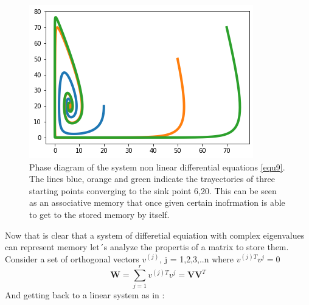 \documentclass[journal]{IEEEtai}
\begin{document}
\begin{figure}
\centering
\includegraphics[width=\linewidth]{SINK.png}
\caption{Phase diagram of the system non linear differential equations \ref{equ9}. The lines blue, orange and green indicate the trayectories of three starting points converging to the sink point 6,20. This can be seen as an associative memory that once given certain inofrmation is able to get to the stored memory by itself. }
 \label{fig:SINK}
\end{figure}
  
Now that is clear that a system of differetial equiation with complex eigenvalues can represent memory let´s analyze the propertis of a matrix to store them. Consider a set of orthogonal vectors $v^{(j)}$, j = 1,2,3,..n where $v^{(j)T}v^{j}=0$
\begin{equation}\label{equ10}
\textbf{W}=\sum_{j=1}^{r} v^{(j)T}v^{j}=\textbf{V}\textbf{V}^T
\end{equation}
And getting back to a linear system as in \cite{gBSB}:
\end{document}
